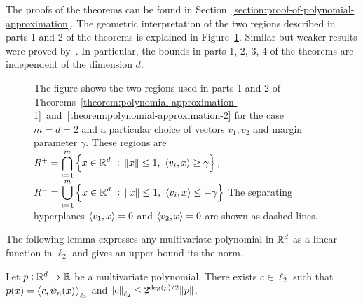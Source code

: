 The proofs of the theorems can be found in
Section~\ref{section:proof-of-polynomial-approximation}. The geometric
interpretation of the two regions described in parts 1 and 2 of the theorems is
explained in Figure~\ref{figure:pizza-slice}. Similar but weaker results were
proved by~\cite{Klivans-Servedio-2008}. In particular, the bounds in parts
1, 2, 3, 4 of the theorems are independent of the dimension $d$.

\begin{figure}
\begin{center}

\end{center}
\caption[]{The figure shows the two regions used in parts 1 and 2 of
Theorems~\ref{theorem:polynomial-approximation-1}~and~\ref{theorem:polynomial-approximation-2}
for the case $m=d=2$ and a particular choice of vectors $v_1, v_2$ and margin
parameter $\gamma$. These regions are
$R^+ = \displaystyle \bigcap_{i=1}^m \left\{ x \in \mathbb{R}^d ~:~ \norm{x} \le 1, \ \left\langle v_i, x \right\rangle \ge \gamma \right\}$,
$R^- = \displaystyle \bigcup_{i=1}^m \left\{ x \in \mathbb{R}^d ~:~ \norm{x} \le 1, \ \left\langle v_i, x \right\rangle \le - \gamma \right\}$
The separating hyperplanes $\left\langle v_1, x \right\rangle = 0$ and $\left\langle v_2, x \right\rangle = 0$ are shown as dashed lines.}
\label{figure:pizza-slice}
\end{figure}



The following lemma expresses any multivariate polynomial in $\mathbb{R}^d$
as a linear function in $\ell_2$ and gives an upper bound its the norm.

\begin{lemma}
\label{lemma:norm-bound}
Let $p:\mathbb{R}^d \to \mathbb{R}$ be a multivariate polynomial.
There exists $c \in \ell_2$ such that $p(x) = \left\langle c, \psi_n(x) \right\rangle_{\ell_2}$
and $\norm{c}_{\ell_2} \le 2^{\deg(p)/2} \norm{p}$.
\end{lemma}

